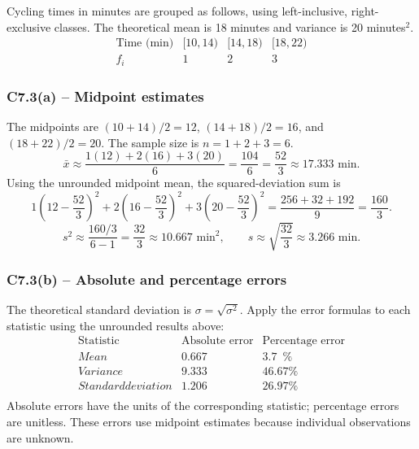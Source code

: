 {
Cycling times in minutes are grouped as follows, using left-inclusive,
right-exclusive classes. The theoretical mean is 18 minutes and variance
is 20 minutes$^2$.
\[
\begin{array}{c|rrr}
\text{Time (min)}&[10,14)&[14,18)&[18,22)\\\hline
f_i&1&2&3
\end{array}
\]
\label{sol:c7-3a}
\subsubsection*{C7.3(a) -- Midpoint estimates }
The midpoints are $(10+14)/2=12$, $(14+18)/2=16$, and
$(18+22)/2=20$. The sample size is $n=1+2+3=6$.
\[
\bar{x}\approx\frac{1(12)+2(16)+3(20)}{6}
=\frac{104}{6}=\frac{52}{3}\approx17.333\text{ min}.
\]
Using the unrounded midpoint mean, the squared-deviation sum is
\[
1\left(12-\frac{52}{3}\right)^2+
2\left(16-\frac{52}{3}\right)^2+
3\left(20-\frac{52}{3}\right)^2
=\frac{256+32+192}{9}=\frac{160}{3}.
\]
\[
s^2\approx\frac{160/3}{6-1}=\frac{32}{3}\approx10.667\text{ min}^2,
\qquad s\approx\sqrt{\frac{32}{3}}\approx3.266\text{ min}.
\]
\label{sol:c7-3b}
\subsubsection*{C7.3(b) -- Absolute and percentage errors }
The theoretical standard deviation is $\sigma=\sqrt{\sigma^2}$.
Apply the error formulas to each statistic using the unrounded results above:
\[
\begin{array}{l|rr}
\text{Statistic}&\text{Absolute error}&\text{Percentage error}\\\hline
Mean&0.667&3.7\phantom{0}\%\\
Variance&9.333&46.67\%\\
Standard deviation&1.206&26.97\%\\
\end{array}
\]
Absolute errors have the units of the corresponding statistic; percentage errors are unitless.
These errors use midpoint estimates because individual observations are unknown.
\secInicio[sec:c7-3]
}

